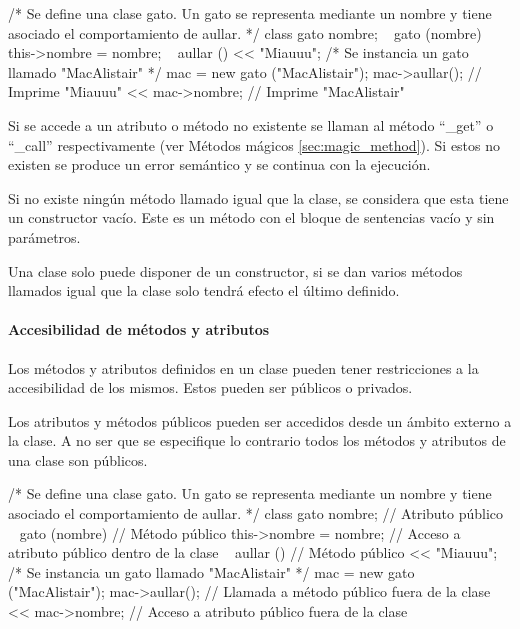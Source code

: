 \begin{myverbatim}
   /*
      Se define una clase gato. Un gato 
      se representa mediante un nombre y tiene
      asociado el comportamiento de aullar.
*/
   class gato {
      nombre;
      ~ gato (nombre) {
        this->nombre = nombre;
      }
      ~ aullar () {
         << "Miauuu";
      }
   }
   /*
      Se instancia un gato 
      llamado "MacAlistair"
   */
   mac = new gato ("MacAlistair"); 
   mac->aullar(); // Imprime "Miauuu"
   << mac->nombre; // Imprime "MacAlistair"
\end{myverbatim}

Si se accede a un atributo o método no existente se llaman al método ``\_get'' o ``\_call'' respectivamente (ver Métodos mágicos \autoref{sec:magic_method}). Si 
estos no existen se produce un error semántico y se continua con la ejecución.

Si no existe ningún método llamado igual que la clase, se considera que esta tiene un constructor vacío. Este es
un método con el bloque de sentencias vacío y sin parámetros.

Una clase solo puede disponer de un constructor, si se dan varios métodos llamados igual que la clase solo tendrá 
efecto el último definido.

\paragraph{Accesibilidad de métodos y atributos}
Los métodos y atributos definidos en un clase pueden tener restricciones a la accesibilidad de los mismos. Estos pueden ser públicos 
o privados.

Los atributos y métodos públicos pueden ser accedidos desde un ámbito externo a la clase. A no ser que se especifique lo contrario todos los
métodos y atributos de una clase son públicos. \\

\begin{myverbatim}
   /*
      Se define una clase gato. Un gato 
      se representa mediante un nombre y tiene
      asociado el comportamiento de aullar.
   */
   class gato {
      nombre; // Atributo público
      ~ gato (nombre) { // Método público
        this->nombre = nombre; // Acceso a atributo público dentro de la clase
      }
      ~ aullar () { // Método público
         << "Miauuu";
      }
   }
   /*
      Se instancia un gato 
      llamado "MacAlistair"
   */
   mac = new gato ("MacAlistair"); 
   mac->aullar(); // Llamada a método público fuera de la clase
   << mac->nombre;  // Acceso a atributo público fuera de la clase
\end{myverbatim}


